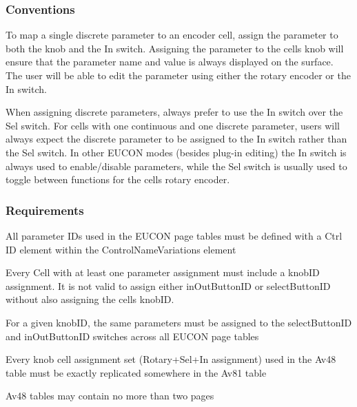 \hypertarget{a00833_subsection_eucon_page_tables_conventions}{}\subsubsection{Conventions}\label{a00833_subsection_eucon_page_tables_conventions}
 
\begin{DoxyItemize}
\item To map a single discrete parameter to an encoder cell, assign the parameter to both the knob and the In switch. Assigning the parameter to the cell\textquotesingle{}s knob will ensure that the parameter name and value is always displayed on the surface. The user will be able to edit the parameter using either the rotary encoder or the In switch.  
\item When assigning discrete parameters, always prefer to use the In switch over the Sel switch. For cells with one continuous and one discrete parameter, users will always expect the discrete parameter to be assigned to the In switch rather than the Sel switch. In other E\+U\+C\+ON modes (besides plug-\/in editing) the In switch is always used to enable/disable parameters, while the Sel switch is usually used to toggle between functions for the cell\textquotesingle{}s rotary encoder.  
\end{DoxyItemize}

\hypertarget{a00833_subsection_eucon_page_tables_requirements}{}\subsubsection{Requirements}\label{a00833_subsection_eucon_page_tables_requirements}
 
\begin{DoxyItemize}
\item All parameter I\+Ds used in the E\+U\+C\+ON page tables must be defined with a {\ttfamily Ctrl ID} element within the {\ttfamily Control\+Name\+Variations} element  
\item Every {\ttfamily Cell} with at least one parameter assignment must include a {\ttfamily knob\+ID} assignment. It is not valid to assign either {\ttfamily in\+Out\+Button\+ID} or {\ttfamily select\+Button\+ID} without also assigning the cell\textquotesingle{}s {\ttfamily knob\+ID}.  
\item For a given {\ttfamily knob\+ID}, the same parameters must be assigned to the {\ttfamily select\+Button\+ID} and {\ttfamily in\+Out\+Button\+ID} switches across all E\+U\+C\+ON page tables  
\item Every knob cell assignment set (Rotary+\+Sel+\+In assignment) used in the {\ttfamily \textquotesingle{}Av48\textquotesingle{}} table must be exactly replicated somewhere in the {\ttfamily \textquotesingle{}Av81\textquotesingle{}} table  
\item {\ttfamily \textquotesingle{}Av48\textquotesingle{}} tables may contain no more than two pages  
\end{DoxyItemize}



